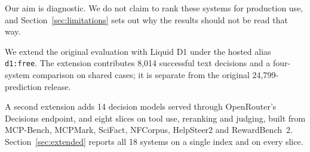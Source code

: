 Our aim is diagnostic. We do not claim to rank these systems for production use, and Section~\ref{sec:limitations} sets out why the results should not be read that way.

We extend the original evaluation with Liquid D1 under the hosted alias
\texttt{d1:free}. The extension contributes 8{,}014 successful text decisions
and a four-system comparison on shared cases; it is separate from the original
24{,}799-prediction release.

A second extension adds 14 decision models served through OpenRouter's
Decisions endpoint, and eight slices on tool use, reranking and judging, built
from MCP-Bench, MCPMark, SciFact, NFCorpus, HelpSteer2 and RewardBench~2.
Section~\ref{sec:extended} reports all 18 systems on a single index and on every
slice.

